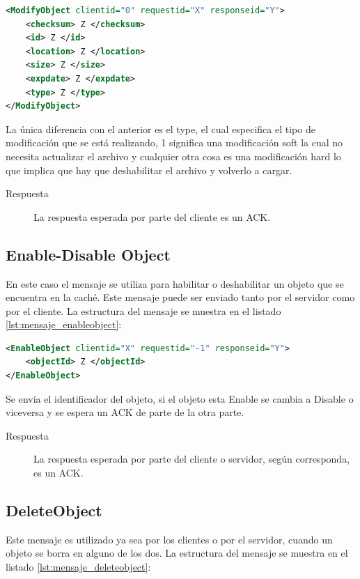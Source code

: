 \begin{lstlisting}[language=XML,caption={Mensaje de ModifyObject},label={lst:mensaje_modifyobject}]
<ModifyObject clientid="0" requestid="X" responseid="Y"> 
	<checksum> Z </checksum>
	<id> Z </id>
	<location> Z </location>
	<size> Z </size>
	<expdate> Z </expdate>
	<type> Z </type>
</ModifyObject>
\end{lstlisting}

La única diferencia con el anterior es el type, el cual especifica el tipo de modificación que se está realizando, 1 significa una modificación soft la cual no necesita actualizar el archivo y cualquier otra cosa es una modificación hard lo que implica que hay que deshabilitar el archivo y volverlo a cargar.

\begin{description}
\item[Respuesta] La respuesta esperada por parte del cliente es un ACK.
\end{description}

\subsection{Enable-Disable Object}

En este caso el mensaje se utiliza para habilitar o deshabilitar un objeto que se encuentra en la caché. Este mensaje puede ser enviado tanto por el servidor como por el cliente. La estructura del mensaje se muestra en el listado \ref{lst:mensaje_enableobject}:

\begin{lstlisting}[language=XML,caption={Mensaje de EnableObject},label={lst:mensaje_enableobject}]
<EnableObject clientid="X" requestid="-1" responseid="Y"> 
	<objectId> Z </objectId>
</EnableObject>
\end{lstlisting}

Se envía el identificador del objeto, si el objeto esta Enable se cambia a Disable o viceversa  y se espera un ACK de parte de la otra parte.

\begin{description}
\item[Respuesta] La respuesta esperada por parte del cliente o servidor, según corresponda, es un ACK.
\end{description}

\subsection{DeleteObject}
Este mensaje es utilizado ya sea por los clientes o por el servidor, cuando un objeto se borra en alguno de los dos. La estructura del mensaje se muestra en el listado \ref{lst:mensaje_deleteobject}:

